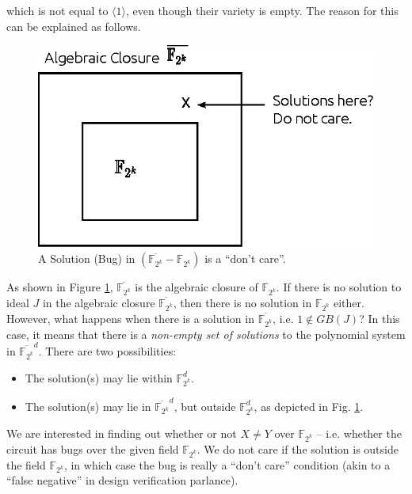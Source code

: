 which is not equal to $\langle 1\rangle$, even though their variety is
empty. The reason for this can be explained as follows. 

\begin{figure}[htb]
\centerline{
\includegraphics[scale=1]{./figures/closure.eps}
}
\caption{ A Solution (Bug) in
  $(\overline{\mathbb{F}_{2^{k}}}-\mathbb{F}_{2^k})$ is a ``don't
  care''.} 
\label{fig:closure}
\end{figure}

As shown in Figure \ref{fig:closure}, $\overline{ \mathbb{F}_{2^k} }$
is the algebraic closure of $\mathbb{F}_{2^k}$.
If there is no solution to ideal $J$ in the algebraic closure
$\overline{ \mathbb{F}_{2^k}}$,  then there is no solution in
$\mathbb{F}_{2^k}$ either. However, what happens when there is a
solution in $\overline{ \mathbb{F}_{2^k}}$, i.e. $1 \notin GB(J)$?  
In this case, it means that there is a {\it non-empty set of
  solutions} to the polynomial system in
$\overline{\mathbb{F}_{2^k}}^d$. There are two possibilities:  
\begin{itemize}
	\item The solution(s) may lie within $\mathbb{F}_{2^k}^d$.
	\item The solution(s) may lie in $\overline
          {\mathbb{F}_{2^k}}^d$, but outside $\mathbb{F}_{2^k}^d$, as
          depicted in  Fig. \ref{fig:closure}. 
\end{itemize}
We are interested in finding out whether or not $X \neq Y$ over $\mathbb{F}_{2^{k}}$ 
-- i.e. whether the circuit has bugs over the given field
$\mathbb{F}_{2^{k}}$. We do not care if the solution is outside the
field $\mathbb{F}_{2^{k}}$, in which case the bug is really a ``don't
care'' condition (akin to a ``false negative'' in design verification
parlance).  


